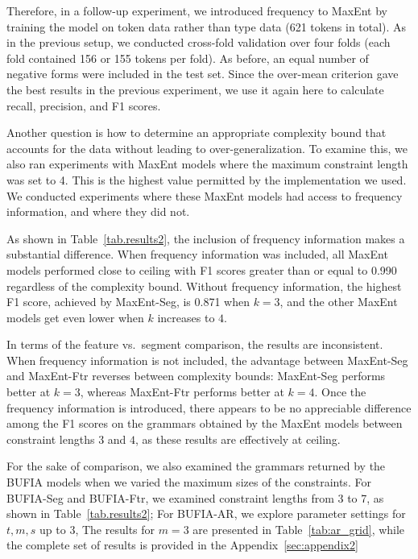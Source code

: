\documentclass[11pt]{article}
\begin{document}
Therefore, in a follow-up experiment, we introduced frequency
to MaxEnt by training the model on token data rather
than type data (621 tokens in total).
As in the previous setup, we conducted cross-fold validation over four
folds (each fold contained 156 or 155 tokens per fold).
As before, an equal number of negative forms were included in the test set.
Since the over-mean criterion gave the best results in the previous experiment,
we use it again here to calculate recall, precision, and F1 scores.


Another question is how to determine an appropriate
complexity bound that accounts for the data without leading to
over-generalization. To examine this, we also ran experiments with
MaxEnt models where the maximum constraint length was set to 4.
This is the highest value permitted by the implementation we used.
We conducted experiments where these MaxEnt models had access to 
frequency information, and where they did not. 


As shown in Table~\ref{tab.results2}, 
the inclusion of frequency information makes a substantial 
difference. When frequency information was included,
all MaxEnt models performed close to ceiling with F1 scores
greater than or equal to 0.990 regardless of the complexity bound. 
Without frequency information, the highest F1 score, achieved by 
MaxEnt-Seg, is 0.871 when $k=3$, and the other MaxEnt models get
even lower when $k$ increases to $4$.

In terms of the feature vs.\ segment comparison, the results are 
inconsistent. When frequency information is not included, the advantage 
between MaxEnt-Seg and MaxEnt-Ftr reverses between complexity bounds: 
MaxEnt-Seg performs better at $k=3$, whereas MaxEnt-Ftr performs 
better at $k=4$. Once the frequency information is introduced, 
there appears to be no appreciable difference among the F1 
scores on the grammars obtained by the MaxEnt models between constraint lengths $3$ and $4$, as these results are effectively at ceiling.


For the sake of comparison, we also examined the grammars returned by
the BUFIA models when we varied the maximum sizes of the constraints.
For BUFIA-Seg and BUFIA-Ftr, we examined constraint lengths from 
3 to 7, as shown in Table~\ref{tab.results2};
For BUFIA-AR, we explore parameter settings for $t,m,s$ up to $3$,
The results for $m=3$ are presented in Table~\ref{tab:ar_grid}, while 
the complete set of results is provided in the Appendix~\ref{sec:appendix2}
\end{document}
